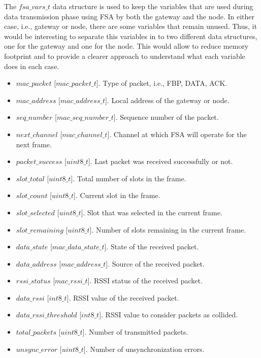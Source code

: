 The $fsa\_vars\_t$ data structure is used to keep the variables that are used during data transmission phase using FSA by both the gateway and the node. In either case, i.e., gateway or node, there are some variables that remain unused. Thus, it would be interesting to separate this variables in to two different data structures, one for the gateway and one for the node. This would allow to reduce memory footprint and to provide a clearer approach to understand what each variable does in each case.
\begin{itemize}
\item $mac\_packet$ [$mac\_packet\_t$]. Type of packet, i.e., FBP, DATA, ACK.
\item $mac\_address$ [$mac\_address\_t$]. Local address of the gateway or node.
\item $seq\_number$ [$mac\_seq\_number\_t$]. Sequence number of the packet.
\item $next\_channel$ [$mac\_channel\_t$].  Channel at which FSA will operate for the next frame.
\item $packet\_success$ [$uint8\_t$]. Last packet was received successfully or not.
\item $slot\_total$ [$uint8\_t$]. Total number of slots in the frame.
\item $slot\_count$ [$uint8\_t$]. Current slot in the frame.
\item $slot\_selected$ [$uint8\_t$]. Slot that was selected in the current frame.
\item $slot\_remaining$ [$uint8\_t$]. Number of slots remaining in the current frame.
\item $data\_state$ [$mac\_data\_state\_t$]. State of the received packet.
\item $data\_address$ [$mac\_address\_t$]. Source of the received packet.
\item $rssi\_status$ [$mac\_rssi\_t$]. RSSI status of the received packet.
\item $data\_rssi$ [$int8\_t$]. RSSI value of the received packet.
\item $data\_rssi\_threshold$ [$int8\_t$]. RSSI value to consider packets as collided.
\item $total\_packets$ [$uint8\_t$]. Number of transmitted packets.
\item $unsync\_error$ [$uint8\_t$]. Number of unsynchronization errors.
\end{itemize}

